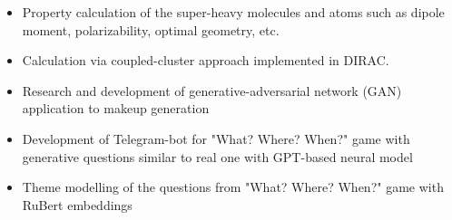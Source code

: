 \begin{itemize}
    \item Property calculation of the super-heavy molecules and atoms such as dipole moment, polarizability, optimal geometry, etc.
    \item Calculation via coupled-cluster approach implemented in DIRAC.
\end{itemize}

\begin{itemize}
    \item Research and development of generative-adversarial network (GAN) application to makeup generation
    \item Development of Telegram-bot for "What? Where? When?" game with generative questions similar to real one with GPT-based neural model
    \item Theme modelling of the questions from "What? Where? When?" game with RuBert embeddings
\end{itemize}

\cvproject{}